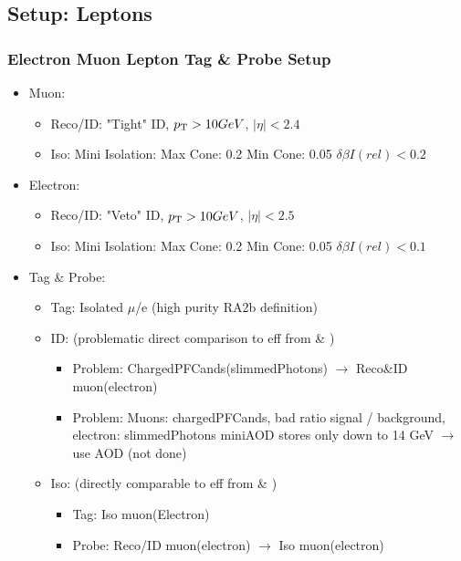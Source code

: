 \documentclass{beamer}
\begin{document}
\subsection{Setup: Leptons}
\begin{frame}
\frametitle{Electron Muon Lepton Tag \& Probe Setup }
\begin{itemize}
 \item Muon:
 \begin{itemize}
  \item Reco/ID: "Tight" ID, $p_{\text{T}}>10 GeV$, $|\eta|<2.4$
  \item Iso: Mini Isolation: Max Cone: 0.2 Min Cone: 0.05 $\delta \beta I(rel)<0.2$
 \end{itemize}
  \item Electron:
 \begin{itemize}
  \item Reco/ID: "Veto" ID, $p_{\text{T}}>10 GeV$, $|\eta|<2.5$
  \item Iso: Mini Isolation: Max Cone: 0.2 Min Cone: 0.05 $\delta \beta I(rel)<0.1$
 \end{itemize}
 \item Tag \& Probe:
 \begin{itemize}
  \item Tag: Isolated $\mu$/e (high purity RA2b definition)
 \item ID:  (problematic direct comparison to eff from \ttbar \& \wpj)
 \begin{itemize}
  \item Problem: ChargedPFCands(slimmedPhotons) $\rightarrow$ Reco\&ID muon(electron)
  \item Problem: Muons: chargedPFCands, bad ratio signal / background, electron: slimmedPhotons miniAOD stores only down to 14 GeV $\rightarrow$ use AOD (not done)
 \end{itemize}
  \item Iso: (directly comparable to eff from \ttbar \& \wpj)
 \begin{itemize}
  \item Tag: Iso muon(Electron)
  \item Probe: Reco/ID muon(electron) $\rightarrow$ Iso muon(electron)
 
 \end{itemize}

 \end{itemize}
\end{itemize}
\end{frame}


\setcounter{framenumber}{12}
\end{document}
